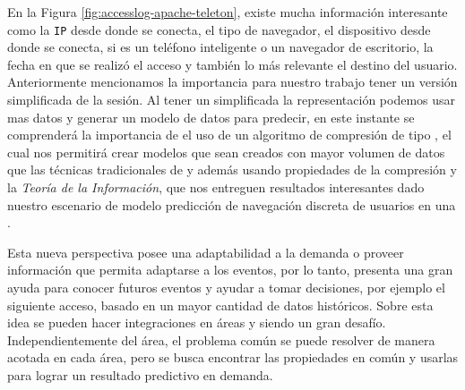 


En la Figura \ref{fig:accesslog-apache-teleton}, existe mucha información interesante como la \texttt{IP} desde donde se conecta, el tipo de navegador, el dispositivo desde donde se conecta, si es un teléfono inteligente o un navegador de escritorio, la fecha en que se realizó el acceso y también lo más relevante el destino del usuario. Anteriormente mencionamos la importancia para nuestro trabajo tener un versión simplificada de la sesión. Al tener un simplificada la representación podemos usar mas datos y generar un modelo de datos para predecir, en este instante se comprenderá la importancia de el uso de un algoritmo de compresión de tipo \losslessdatacompression, el cual nos permitirá crear modelos que sean creados con mayor volumen de datos que las técnicas tradicionales de \machinelearning y además usando propiedades de la compresión y la \emph{Teoría de la Información}, que nos entreguen resultados interesantes dado nuestro escenario de modelo predicción de navegación discreta de usuarios en una \www.
   
Esta nueva perspectiva posee una adaptabilidad a la demanda o proveer información que permita adaptarse a los eventos, por lo tanto, presenta una gran ayuda para conocer futuros eventos y ayudar a tomar decisiones, por ejemplo el siguiente acceso, basado en un mayor cantidad de datos históricos. Sobre esta idea se pueden hacer integraciones en áreas \losslessdatacompression y \machinelearning siendo un gran desafío. Independientemente del área, el problema común  se puede resolver de manera acotada en cada área, pero se busca encontrar las propiedades en común y usarlas para lograr un resultado predictivo en demanda.  